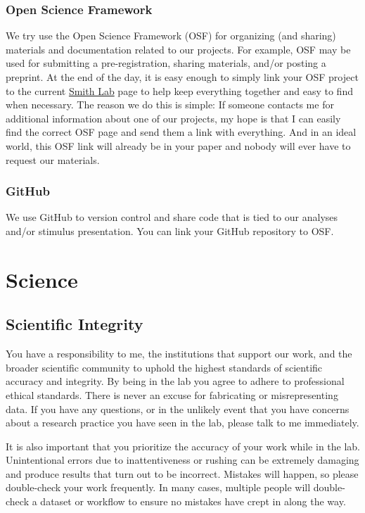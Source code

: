 \documentclass[letterpaper,11pt,oneside]{memoir}
\begin{document}
\subsection{Open Science Framework}
We try use the Open Science Framework (OSF) for organizing (and sharing) materials and documentation related to our projects. For example, OSF may be used for submitting a pre-registration, sharing materials, and/or posting a preprint. At the end of the day, it is easy enough to simply link your OSF project to the current \href{https://osf.io/myxet/}{Smith Lab} page to help keep everything together and easy to find when necessary. The reason we do this is simple: If someone contacts me for additional information about one of our projects, my hope is that I can easily find the correct OSF page and send them a link with everything. And in an ideal world, this OSF link will already be in your paper and nobody will ever have to request our materials. 

\subsection{GitHub}
We use GitHub to version control and share code that is tied to our analyses and/or stimulus presentation. You can link your GitHub repository to OSF. 


\chapter{Science}

\section{Scientific Integrity}

You have a responsibility to me, the institutions that support our work, and the broader scientific community to uphold the highest standards of scientific accuracy and integrity. By being in the lab you agree to adhere to professional ethical standards. There is never an excuse for fabricating or misrepresenting data. If you have any questions, or in the unlikely event that you have concerns about a research practice you have seen in the lab, please talk to me immediately.

It is also important that you prioritize the accuracy of your work while in the lab. Unintentional errors due to inattentiveness or rushing can be extremely damaging and produce results that turn out to be incorrect. Mistakes will happen, so please double-check your work frequently. In many cases, multiple people will double-check a dataset or workflow to ensure no mistakes have crept in along the way.
\end{document}
